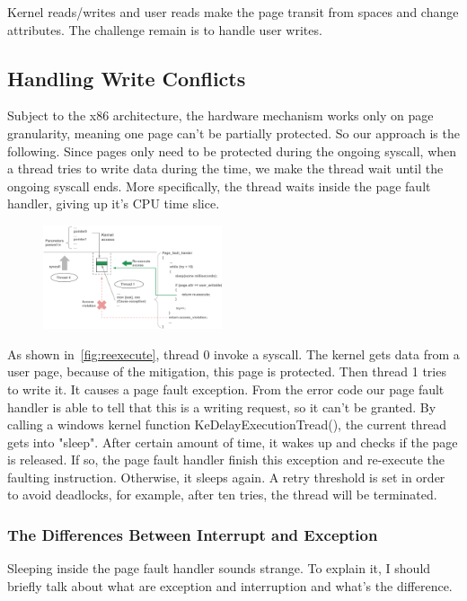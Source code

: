 Kernel reads/writes and user reads make the page transit from spaces and change attributes. The challenge remain is to handle user writes. 


\subsection{Handling Write Conflicts}
Subject to the x86 architecture, the hardware mechanism works only on page granularity, meaning one page can't be partially protected. So our approach is the following. Since pages only need to be protected during the ongoing syscall, when a thread tries to write data during the time, we make the thread wait until the ongoing syscall ends. More specifically, the thread waits inside the page fault handler, giving up it's CPU time slice. 

\begin{figure}[th]
  \includegraphics[width=0.47\textwidth]{figures/reexecute}
  \centering
  \caption{}
  \label{fig:reexecute}
\end{figure}


As shown in~\autoref{fig:reexecute}, thread 0 invoke a syscall. The kernel gets data from a user page, because of the mitigation, this page is protected. Then thread 1 tries to write it. It causes a page fault exception. From the error code our page fault handler is able to tell that this is a writing request, so it can't be granted. By calling a windows kernel function KeDelayExecutionTread(), the current thread gets into "sleep". After certain amount of time, it wakes up and checks if the page is released. If so, the page fault handler finish this exception and re-execute the faulting instruction. Otherwise, it sleeps again. A retry threshold is set in order to avoid deadlocks, for example, after ten tries, the thread will be terminated.  

\subsubsection{The Differences Between Interrupt and Exception}

Sleeping inside the page fault handler sounds strange. To explain it, I should briefly talk about what are exception and interruption and what's the difference.

